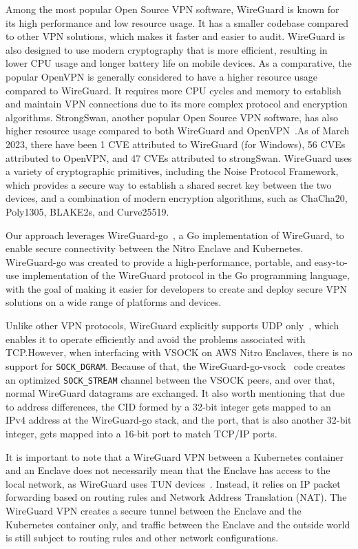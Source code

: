 \documentclass[a4paper, twocolumn]{article}
\begin{document}
Among the most popular Open Source VPN software, WireGuard is known for its
high performance and low resource usage. It has a smaller codebase compared to
other VPN solutions, which makes it faster and easier to audit. WireGuard is
also designed to use modern cryptography that is more efficient, resulting in
lower CPU usage and longer battery life on mobile devices. As a comparative,
the popular OpenVPN is generally considered to have a higher resource usage
compared to WireGuard. It requires more CPU cycles and memory to establish and
maintain VPN connections due to its more complex protocol and encryption
algorithms. StrongSwan, another popular Open Source VPN software, has also
higher resource usage compared to both WireGuard and
OpenVPN~\cite{vpnperf_2019}.\@ As of March 2023, there have been 1 CVE
attributed to WireGuard (for Windows), 56 CVEs attributed to OpenVPN, and 47
CVEs attributed to strongSwan. WireGuard uses a variety of cryptographic
primitives, including the Noise Protocol Framework, which provides a secure way
to establish a shared secret key between the two devices, and a combination of
modern encryption algorithms, such as ChaCha20, Poly1305, BLAKE2s, and
Curve25519.

Our approach leverages WireGuard-go~\cite{wggo_2023}, a Go implementation of
WireGuard, to enable secure connectivity between the Nitro Enclave and
Kubernetes. WireGuard-go was created to provide a high-performance, portable,
and easy-to-use implementation of the WireGuard protocol in the Go programming
language, with the goal of making it easier for developers to create and deploy
secure VPN solutions on a wide range of platforms and devices.

Unlike other VPN protocols, WireGuard explicitly supports UDP
only~\cite{wglimits_2015}, which enables it to operate efficiently and avoid
the problems associated with TCP.\@ However, when interfacing with VSOCK on AWS
Nitro Enclaves, there is no support for \texttt{SOCK\_DGRAM}. Because of that,
the WireGuard-go-vsock~\cite{wgvsock_2023} code creates an optimized
\texttt{SOCK\_STREAM} channel between the VSOCK peers, and over that, normal
WireGuard datagrams are exchanged. It also worth mentioning that due to address
differences, the CID formed by a 32-bit integer gets mapped to an IPv4 address
at the WireGuard-go stack, and the port, that is also another 32-bit integer,
gets mapped into a 16-bit port to match TCP/IP ports.

It is important to note that a WireGuard VPN between a Kubernetes container and
an Enclave does not necessarily mean that the Enclave has access to the local
network, as WireGuard uses TUN devices~\cite{tuntap_2023}. Instead, it relies
on IP packet forwarding based on routing rules and Network Address Translation
(NAT). The WireGuard VPN creates a secure tunnel between the Enclave and the
Kubernetes container only, and traffic between the Enclave and the outside
world is still subject to routing rules and other network configurations.
\end{document}
